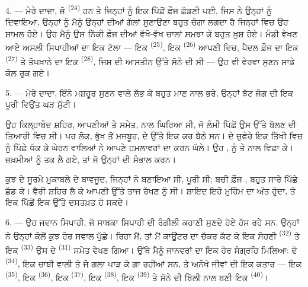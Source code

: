 \VUsaut{4.0mm}
\VUsaut{2.8mm}

4. --- ਮੇਰੇ ਦਾਦਾ, ਜੋ  \textsuperscript{(24)} ਹਨ ਤੇ
ਜਿਨ੍ਹਾਂ ਨੂੰ ਇਕ  ਪਿੱਛੋਂ ਫ਼ੌਜ ਛੱਡਣੀ ਪਈ, ਜਿਸ ਨੇ ਉਨ੍ਹਾਂ ਨੂੰ
 ਦਿਵਾਇਆ, ਉਨ੍ਹਾਂ ਨੂੰ ਮੈਨੂੰ ਉਨ੍ਹਾਂ  ਦੀਆਂ
ਗੱਲਾਂ ਸੁਣਾਉਣਾ ਬਹੁਤ ਚੰਗਾ ਲਗਦਾ ਹੈ ਜਿਨ੍ਹਾਂ ਵਿਚ ਉਹ ਸ਼ਾਮਲ ਹੋਏ। ਉਹ ਮੈਨੂੰ ਉਸ ਨਿੱਕੀ ਫ਼ੌਜ
ਦੀਆਂ ਵੱਖੋ-ਵੱਖ ਚਾਲਾਂ ਸਮਝਾ ਕੇ ਬਹੁਤ ਖ਼ੁਸ਼ ਹੋਏ। ਮੰਡੀ ਵੇਖਣ ਆਏ ਅਸਲੀ ਸਿਪਾਹੀਆਂ ਦਾ ਇਕ ਟੋਲਾ —
ਇਕ  \textsuperscript{(25)}, ਇਕ 
\textsuperscript{(26)} ਆਪਣੀ  ਵਿਚ, ਪੈਦਲ ਫ਼ੌਜ ਦਾ ਇਕ
 \textsuperscript{(27)} ਤੇ ਤੋਪਖ਼ਾਨੇ ਦਾ ਇਕ 
\textsuperscript{(28)}, ਜਿਸ ਦੀ ਆਸਤੀਨ ਉੱਤੇ ਸੋਨੇ ਦੀ  ਸੀ — ਉਹ ਵੀ ਵੇਰਵਾ
ਸੁਣਨ ਸਾਡੇ ਕੋਲ ਰੁਕ ਗਏ।

5. --- ਮੇਰੇ ਦਾਦਾ, ਇੰਨੇ ਮਸ਼ਹੂਰ ਸੁਣਨ ਵਾਲੇ ਲੱਭ ਕੇ ਬਹੁਤ ਮਾਣ ਨਾਲ ਭਰੇ, ਉਨ੍ਹਾਂ ਝੱਟ ਜੰਗ ਦੀ
ਇਕ ਪੂਰੀ ਵਿਉਂਤ ਘੜ ਸੁੱਟੀ।

ਉਹ ਕਿਲ੍ਹਾਬੰਦ ਸ਼ਹਿਰ, ਆਪਣੀਆਂ  ਤੇ  ਸਮੇਤ,
 ਨਾਲ ਘਿਰਿਆ ਸੀ, ਜੋ ਲੰਮੀ  ਪਿੱਛੋਂ ਉਸ ਉੱਤੇ
 ਬੋਲਣ ਦੀ ਤਿਆਰੀ ਵਿਚ ਸੀ। ਪਰ  ਲੋਕ, ਭੁੱਖ ਤੋਂ ਮਜਬੂਰ,
 ਦੇ  ਉੱਤੇ ਇਕ  ਕਰ ਬੈਠੇ ਸਨ।
 ਦੇ ਚੁਫੇਰੇ ਇਕ ਤਿੱਖੀ  ਵਿਚ  ਨੂੰ ਪਿੱਛੇ ਧੱਕ
ਕੇ  ਘੇਰਨ ਵਾਲਿਆਂ ਨੇ ਆਪਣੇ 
 ਹਮਲਾਵਰਾਂ ਦਾ  ਕਰਨ ਘੱਲੇ। ਉਹ ,
 ਨੂੰ  ਤੇ  ਨਾਲ ਵਿਛਾ ਕੇ।
 ਜ਼ਖ਼ਮੀਆਂ ਨੂੰ  ਤਕ ਲੈ ਗਏ, ਤਾਂ ਜੋ
 ਉਨ੍ਹਾਂ ਦੀ ਸੰਭਾਲ ਕਰਨ।

ਕੁਝ  ਦੇ ਸੂਰਮੇ ਮੁਕਾਬਲੇ ਦੇ ਬਾਵਜੂਦ, ਜਿਨ੍ਹਾਂ ਨੇ 
ਬਣਾਇਆ ਸੀ,  ਪੂਰੀ ਸੀ; ਬਚੀ ਫ਼ੌਜ , ਬਹੁਤ ਸਾਰੇ
 ਪਿੱਛੇ ਛੱਡ ਕੇ। ਵੈਰੀ ਸ਼ਹਿਰ ਲੈ ਕੇ ਆਪਣੀ  ਉੱਤੇ ਤਾਜ ਰੱਖਣ ਨੂੰ
ਸੀ। ਸ਼ਾਇਦ ਇਹੋ ਮੁਹਿੰਮ ਦਾ ਅੰਤ ਹੁੰਦਾ, ਤੇ ਇਕ  ਪਿੱਛੋਂ ਇਕ
 ਉੱਤੇ ਦਸਤਖ਼ਤ ਹੋ ਸਕਦੇ।

\VUsaut{4.4mm}
\VUsaut{2.8mm}

6. --- ਉਹ ਜਵਾਨ ਸਿਪਾਹੀ, ਜੋ ਸਾਬਕਾ ਸਿਪਾਹੀ ਦੀ ਰੰਗੀਲੀ ਕਹਾਣੀ ਸੁਣਦੇ ਹੋਏ ਹੱਸ ਰਹੇ ਸਨ,
ਉਨ੍ਹਾਂ ਨੇ ਉਨ੍ਹਾਂ ਕੋਲੋਂ ਕੁਝ ਹੋਰ ਸਵਾਲ ਪੁੱਛੇ। ਰਿਹਾ ਮੈਂ, ਤਾਂ ਮੈਂ ਕਾਊਂਟਰ ਦਾ ਚੱਕਰ ਕੱਟ ਕੇ
ਇਕ ਸੋਹਣੀ  \textsuperscript{(32)} ਤੇ ਇਕ 
\textsuperscript{(33)} ਉਸ ਦੇ  \textsuperscript{(31)} ਸਮੇਤ ਵੇਖਣ ਗਿਆ। ਉੱਥੇ
ਮੈਨੂੰ ਜਾਨਵਰਾਂ ਦਾ ਇਕ ਹੋਰ ਸੰਗ੍ਰਹਿ ਮਿਲਿਆ: ਦੋ 
\textsuperscript{(34)}, ਇਕ ਚਾਬੀ ਵਾਲੀ  ਤੇ  ਜੋ ਗਲਾ
ਪਾੜ ਕੇ ਗਾ ਰਹੀਆਂ ਸਨ, ਤੇ ਅਨੋਖੇ ਜੀਵਾਂ ਦੀ ਇਕ ਕਤਾਰ — ਇਕ 
\textsuperscript{(35)}, ਇਕ  \textsuperscript{(36)}, ਇਕ 
\textsuperscript{(37)}, ਇਕ  \textsuperscript{(38)}, ਇਕ 
\textsuperscript{(39)} ਤੇ ਸੋਨੇ ਦੀ ਝਿੱਲੀ ਨਾਲ ਬਣੀ ਇਕ 
\textsuperscript{(40)}।

